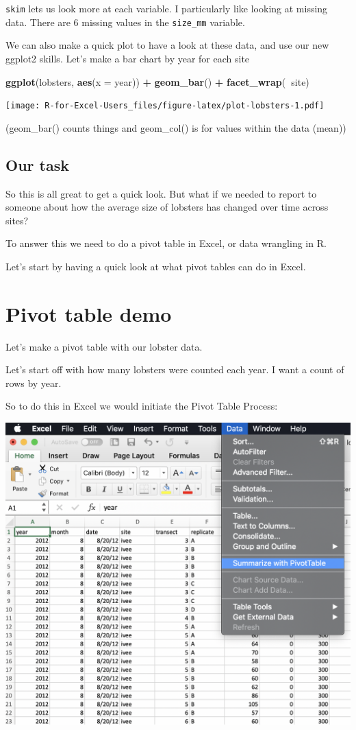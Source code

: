 \documentclass[]{book}
\newenvironment{Shaded}{\begin{snugshade}}{\end{snugshade}}
\newcommand{\DataTypeTok}[1]{\textcolor[rgb]{0.13,0.29,0.53}{#1}}
\newcommand{\KeywordTok}[1]{\textcolor[rgb]{0.13,0.29,0.53}{\textbf{#1}}}
\newcommand{\NormalTok}[1]{#1}
\newcommand{\OperatorTok}[1]{\textcolor[rgb]{0.81,0.36,0.00}{\textbf{#1}}}
\newcommand{\StringTok}[1]{\textcolor[rgb]{0.31,0.60,0.02}{#1}}
\begin{document}
\texttt{skim} lets us look more at each variable. I particularly like looking at missing data. There are 6 missing values in the \texttt{size\_mm} variable.

We can also make a quick plot to have a look at these data, and use our new ggplot2 skills. Let's make a bar chart by year for each site

\begin{Shaded}
\begin{Highlighting}[]
\KeywordTok{ggplot}\NormalTok{(lobsters, }\KeywordTok{aes}\NormalTok{(}\DataTypeTok{x =}\NormalTok{ year)) }\OperatorTok{+}
\StringTok{  }\KeywordTok{geom_bar}\NormalTok{() }\OperatorTok{+}
\StringTok{  }\KeywordTok{facet_wrap}\NormalTok{(}\OperatorTok{~}\NormalTok{site)}
\end{Highlighting}
\end{Shaded}

\texttt{[image: R-for-Excel-Users\_files/figure-latex/plot-lobsters-1.pdf]}

(geom\_bar() counts things and geom\_col() is for values within the data (mean))

\hypertarget{our-task}{%
\subsection{Our task}\label{our-task}}

So this is all great to get a quick look. But what if we needed to report to someone about how the average size of lobsters has changed over time across sites?

To answer this we need to do a pivot table in Excel, or data wrangling in R.

Let's start by having a quick look at what pivot tables can do in Excel.

\hypertarget{pivot-table-demo}{%
\section{Pivot table demo}\label{pivot-table-demo}}

Let's make a pivot table with our lobster data.

Let's start off with how many lobsters were counted each year. I want a count of rows by year.

So to do this in Excel we would initiate the Pivot Table Process:

\includegraphics[width=0.6\linewidth]{img/pivot-table-menu}
\end{document}
